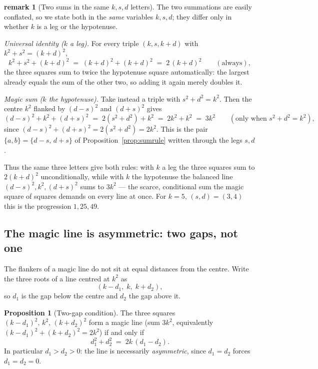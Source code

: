 \documentclass[11pt]{article}
\theoremstyle{definition}
\newtheorem{proposition}{Proposition}
\newtheorem{remark}{remark}
\begin{document}
\begin{remark}[Two sums in the same $k,s,d$ letters]
The two summations are easily conflated, so we state both in the \emph{same}
variables $k,s,d$; they differ only in whether $k$ is a leg or the hypotenuse.

\emph{Universal identity ($k$ a leg).} For every triple $(k,s,k+d)$ with
$k^{2}+s^{2}=(k+d)^{2}$,
\[
  k^{2}+s^{2}+(k+d)^{2} \;=\; (k+d)^{2}+(k+d)^{2} \;=\; 2\,(k+d)^{2}
  \qquad(\text{always}),
\]
the three squares sum to twice the hypotenuse square automatically: the largest
already equals the sum of the other two, so adding it again merely doubles it.

\emph{Magic sum ($k$ the hypotenuse).} Take instead a triple with
$s^{2}+d^{2}=k^{2}$. Then the centre $k^{2}$ flanked by $(d-s)^{2}$ and
$(d+s)^{2}$ gives
\[
  (d-s)^{2}+k^{2}+(d+s)^{2} \;=\; 2(s^{2}+d^{2})+k^{2} \;=\; 2k^{2}+k^{2} \;=\; 3k^{2}
  \qquad(\text{only when } s^{2}+d^{2}=k^{2}),
\]
since $(d-s)^{2}+(d+s)^{2}=2(s^{2}+d^{2})=2k^{2}$. This is the pair
$\{a,b\}=\{d-s,\,d+s\}$ of Proposition~\ref{prop:sumrule} written through the
legs $s,d$.

Thus the same three letters give both rules: with $k$ a leg the three squares
sum to $2(k+d)^{2}$ unconditionally, while with $k$ the hypotenuse the balanced
line $(d-s)^{2},k^{2},(d+s)^{2}$ sums to $3k^{2}$ --- the scarce, conditional
sum the magic square of squares demands on every line at once. For $k=5$,
$(s,d)=(3,4)$ this is the progression $1,25,49$.
\end{remark}

\subsection{The magic line is asymmetric: two gaps, not one}

The flankers of a magic line do not sit at equal distances from the centre.
Write the three roots of a line centred at $k^{2}$ as
\[
  (k-d_{1},\; k,\; k+d_{2}),
\]
so $d_{1}$ is the gap below the centre and $d_{2}$ the gap above it.

\begin{proposition}[Two-gap condition]\label{prop:twogap}
The three squares $(k-d_{1})^{2},\,k^{2},\,(k+d_{2})^{2}$ form a magic line
(sum $3k^{2}$, equivalently $(k-d_{1})^{2}+(k+d_{2})^{2}=2k^{2}$) if and only if
\[
  d_{1}^{2}+d_{2}^{2} \;=\; 2k\,(d_{1}-d_{2}).
\]
In particular $d_{1}>d_{2}>0$: the line is necessarily \emph{asymmetric}, since
$d_{1}=d_{2}$ forces $d_{1}=d_{2}=0$.
\end{proposition}
\end{document}
